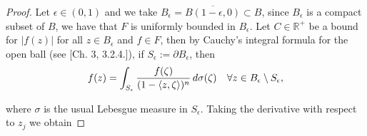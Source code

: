 \documentclass[12pt,twoside,a4paper]{report}
\newcommand{\re}{\ensuremath{\mathbb R }}
\begin{document}
  \begin{proof}
  Let $\epsilon\in(0,1)$ and we take
  $B_{\epsilon}=\overline{B(1-\epsilon,0)}\subset B$, since
  $B_{\epsilon}$ is a compact subset of $B$, we have that $F$ is uniformly
  bounded in $B_{\epsilon}$. Let $C\in\re^{+}$ be a bound for $|
  f(z)|$ for all $z\in B_{\epsilon}$ and $f\in F$, then by Cauchy's
  integral formula for the open ball (see \cite{rudin}[Ch. 3, 3.2.4.]), if
  $S_{\epsilon}:=\partial B_{\epsilon}$, then
  \begin{equation}
    f(z)=\int_{S_{\epsilon}} \frac{f(\zeta)}{(1-\langle z,\zeta\rangle)^{n}}\,d\sigma(\zeta)
    \hspace{0.3cm}\,\forall z\in B_{\epsilon}\setminus S_{\epsilon},
  \end{equation}

  \noindent where $\sigma$ is the usual Lebesgue measure in $S_{\epsilon}$. Taking the derivative  with
  respect to $z_{j}$ we obtain


\end{proof}
\end{document}
